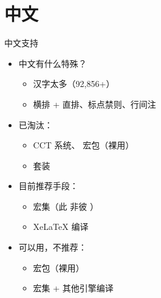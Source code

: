 \section{中文}

\begin{frame}{中文支持}
    \begin{itemize}
      \item 中文有什么特殊？
      \pause
        \begin{itemize}
          \item 汉字太多（92,856+）\pause
          \item 横排 + 直排、标点禁则、行间注 
        \end{itemize} 
        \pause
      \item 已淘汰：
        \begin{itemize}
          \item CCT 系统、 宏包（裸用）
          \item \CTeX{} 套装
        \end{itemize} 
        \pause
      \item 目前推荐手段：
        \begin{itemize}
          \item \alert{ 宏集}（此  非彼 \CTeX{}）
          \item Xe\LaTeX{} 编译
        \end{itemize}
        \pause
      \item 可以用，不推荐：
        \begin{itemize}
          \item {} 宏包（裸用）
          \item {} 宏集 + 其他引擎编译
        \end{itemize}
    \end{itemize}
\end{frame}
  
